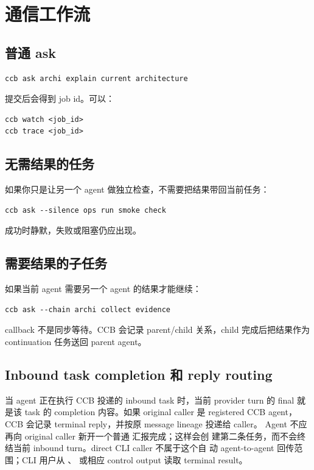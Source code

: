 \chapter{通信工作流}

\section{普通 ask}

\begin{lstlisting}
ccb ask archi explain current architecture
\end{lstlisting}

提交后会得到 job id。可以：

\begin{lstlisting}
ccb watch <job_id>
ccb trace <job_id>
\end{lstlisting}

\section{无需结果的任务}

如果你只是让另一个 agent 做独立检查，不需要把结果带回当前任务：

\begin{lstlisting}
ccb ask --silence ops run smoke check
\end{lstlisting}

成功时静默，失败或阻塞仍应出现。

\section{需要结果的子任务}

如果当前 agent 需要另一个 agent 的结果才能继续：

\begin{lstlisting}
ccb ask --chain archi collect evidence
\end{lstlisting}

callback 不是同步等待。CCB 会记录 parent/child 关系，child 完成后把结果作为 continuation 任务送回 parent agent。

\section{Inbound task completion 和 reply routing}

当 agent 正在执行 CCB 投递的 inbound task 时，当前 provider turn 的 final
就是该 task 的 completion 内容。如果 original caller 是 registered CCB agent，
CCB 会记录 terminal reply，并按原 message lineage 投递给 caller。
Agent 不应再向 original caller 新开一个普通  汇报完成；这样会创
建第二条任务，而不会终结当前 inbound turn。direct CLI caller 不属于这个自
动 agent-to-agent 回传范围；CLI 用户从 、 或相应
control output 读取 terminal result。

